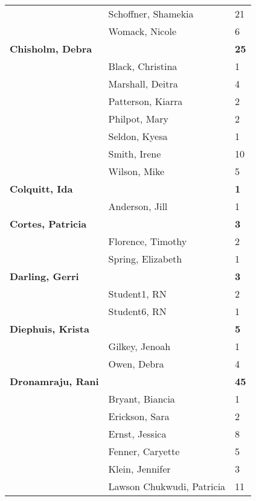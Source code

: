 \documentclass{article}\usepackage[]{graphicx}\usepackage[]{color}
\begin{document}
{\begin{longtable} { >{\raggedright}p{}|p{}p{}}
   \rowcolor[gray]{0.90} & Schoffner, Shamekia & 21 \\ 
   & Womack, Nicole & 6 \\ 
  \textbf{Chisholm, Debra} &  & \hspace{2cm}\textbf{25} \\ 
   & Black, Christina & 1 \\ 
   \rowcolor[gray]{0.90} & Marshall, Deitra & 4 \\ 
   \rowcolor[gray]{0.90} & Patterson, Kiarra & 2 \\ 
   \rowcolor[gray]{0.90} & Philpot, Mary & 2 \\ 
   & Seldon, Kyesa & 1 \\ 
   & Smith, Irene & 10 \\ 
   & Wilson, Mike & 5 \\ 
   \rowcolor[gray]{0.90}\textbf{Colquitt, Ida} &  & \hspace{2cm}\textbf{1} \\ 
   \rowcolor[gray]{0.90} & Anderson, Jill & 1 \\ 
   \rowcolor[gray]{0.90}\textbf{Cortes, Patricia} &  & \hspace{2cm}\textbf{3} \\ 
   & Florence, Timothy & 2 \\ 
   & Spring, Elizabeth & 1 \\ 
  \textbf{Darling, Gerri} &  & \hspace{2cm}\textbf{3} \\ 
   \rowcolor[gray]{0.90} & Student1, RN & 2 \\ 
   \rowcolor[gray]{0.90} & Student6, RN & 1 \\ 
   \rowcolor[gray]{0.90}\textbf{Diephuis, Krista} &  & \hspace{2cm}\textbf{5} \\ 
   & Gilkey, Jenoah & 1 \\ 
   & Owen, Debra & 4 \\ 
  \textbf{Dronamraju, Rani} &  & \hspace{2cm}\textbf{45} \\ 
   \rowcolor[gray]{0.90} & Bryant, Biancia & 1 \\ 
   \rowcolor[gray]{0.90} & Erickson, Sara & 2 \\ 
   \rowcolor[gray]{0.90} & Ernst, Jessica & 8 \\ 
   & Fenner, Caryette & 5 \\ 
   & Klein, Jennifer & 3 \\ 
   & Lawson Chukwudi, Patricia & 11 \\ 

\end{longtable}}
\end{document}
